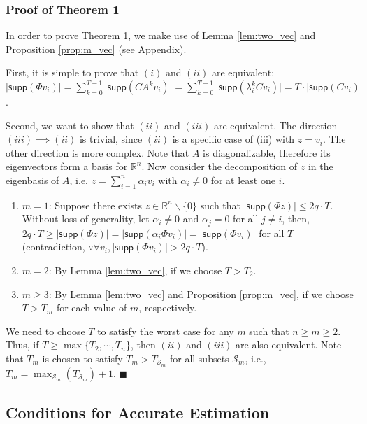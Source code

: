 \documentclass[../../thesis.tex]{subfiles}
\begin{document}
 

\subsubsection{Proof of Theorem 1}
In order to prove Theorem 1, we make use of Lemma \ref{lem:two_vec} and Proposition \ref{prop:m_vec} (see Appendix).

First, it is simple to prove that $(i)$ and $(ii)$ are equivalent: $\lvert \textsf{supp} (\Phi v_i) \rvert = \sum_{k=0}^{T-1} \lvert \textsf{supp} (CA^k v_i ) \rvert = \sum_{k=0}^{T-1} \lvert  \textsf{supp} (\lambda_i^k C v_i )\rvert  = T\cdot  \lvert \textsf{supp} (C v_i) \rvert  $. 

Second, we want to show that $(ii)$ and $(iii)$ are equivalent. The direction $(iii) \implies (ii)$ is trivial, since $(ii)$ is a specific case of (iii) with $z = v_i$. The other direction is more complex. Note that $A$ is diagonalizable, therefore its eigenvectors form a basis for $\mathbb{R}^n$. Now consider the decomposition of $z $ in the eigenbasis of $A$, i.e. $z = \sum_{i=1}^n \alpha_i v_i$ with $\alpha_i \neq 0$ for at least one $i$. 
\begin{enumerate}
\item $m=1$: Suppose there exists $z \in \mathbb{R}^n \backslash \{ 0\}$ such that $ \lvert \textsf{supp} (\Phi z) \rvert \le 2 q \cdot T$. Without loss of generality, let $\alpha_i \neq 0$ and $\alpha_j= 0$ for all $j \neq i$, then, $2 q \cdot T \ge \lvert \textsf{supp} (\Phi z) \rvert = \lvert \textsf{supp} (\alpha_i \Phi v_i) \rvert = \lvert \textsf{supp} (\Phi v_i) \rvert $ for all $T$ (contradiction, $\because \forall v_i, \lvert \textsf{supp} (\Phi v_i) \rvert  > 2 q \cdot T$). 
\item $m=2$: By Lemma \ref{lem:two_vec}, if we choose $T>T_2$.
\item $m\ge 3$: By Lemma \ref{lem:two_vec} and Proposition \ref{prop:m_vec}, if we choose $T>T_m$ for each value of $m$, respectively.
\end{enumerate}
We need to choose $T$ to satisfy the worst case for any $m$ such that $n \ge m \ge 2$. Thus, if $T \ge \max \{ T_2, \cdots, T_n \}$, then $(ii)$ and $(iii)$ are also equivalent. Note that $T_m$ is chosen to satisfy $T_m > T_{\mathcal{S}_m}$ for all subsets $\mathcal{S}_m$, i.e., $T_m = \max_{\mathcal{S}_m}( T_{\mathcal{S}_m})+1$.
\hfill$\blacksquare$


\subsection{Conditions for Accurate Estimation}
\end{document}

